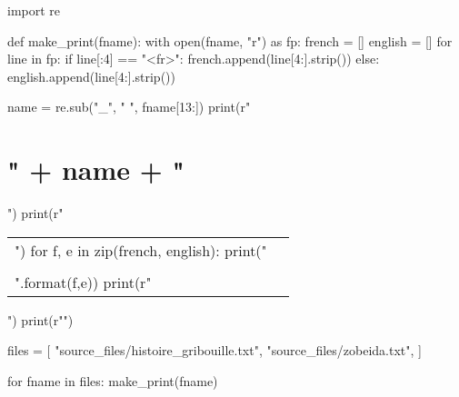 \documentclass[a5paper]{article}
\begin{document}
\tableofcontents
\clearpage

\begin{pycode}
import re

def make_print(fname):
    with open(fname, "r") as fp:
        french = []
        english = []
        for line in fp:
            if line[:4] == "<fr>":
                french.append(line[4:].strip())
            else:
                english.append(line[4:].strip())

    name = re.sub("_", " ", fname[13:])
    print(r"\section{" + name + "}")
    print(r"\begin{longtable}{PP}")
    for f, e in zip(french, english):
        print("{} & {} \\\\".format(f,e))
    print(r"\end{longtable}")
    print(r"\clearpage")



files = [
    "source_files/histoire_gribouille.txt",
    "source_files/zobeida.txt",
]


for fname in files:
    make_print(fname)
\end{pycode}
\end{document}
